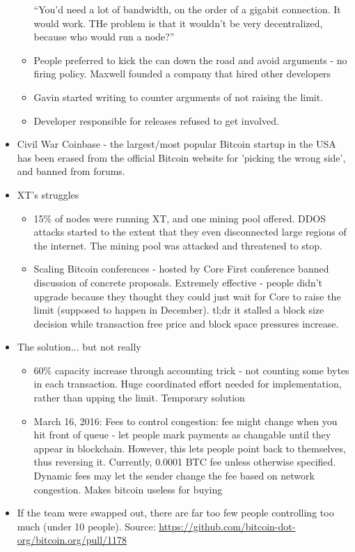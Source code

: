\documentclass{article}
\begin{document}
\begin{itemize}
\begin{itemize}
        \subitem ``You'd need a lot of bandwidth, on the order of a gigabit connection. It would work. THe problem is that it wouldn't be very decentralized, because
        who would run a node?''
      \item People preferred to kick the can down the road and avoid arguments - no firing policy. Maxwell founded a company that hired other developers
      \item Gavin started writing to counter arguments of not raising the limit.
      \item Developer responsible for releases refused to get involved.
    \end{itemize}
  \item Civil War
    \subitem Coinbase - the largest/most popular Bitcoin startup in the USA has been erased from the official Bitcoin website for
    'picking the wrong side', and banned from forums.
  \item XT's struggles
    \begin{itemize}
      \item 15\% of nodes were running XT, and one mining pool offered. DDOS attacks started to the extent that
        they even disconnected large regions of the internet. The mining pool was attacked and threatened to stop.
      \item Scaling Bitcoin conferences - hosted by Core
        \subitem First conference banned discussion of concrete proposals.
        \subitem Extremely effective - people didn't upgrade because they thought they could just wait for Core to raise the limit (supposed to
        happen in December).
        \subitem tl;dr it stalled a block size decision while transaction free price and block space pressures increase.
    \end{itemize}
  \item The solution... but not really
    \begin{itemize}
      \item 60\% capacity increase through accounting trick - not counting some bytes in each transaction.
        \subitem Huge coordinated effort needed for implementation, rather than upping the limit.
        \subitem Temporary solution
      \item March 16, 2016: Fees to control congestion: fee might change when you hit front of queue - let people mark payments as
        changable until they appear in blockchain. However, this lets people point back to themselves, thus reversing it.
        \subitem Currently, 0.0001 BTC fee unless otherwise specified. Dynamic fees may let the sender change the fee based on network congestion.
        \subitem Makes bitcoin useless for buying
    \end{itemize}
  \item If the team were swapped out, there are far too few people controlling too much (under 10 people).
    Source: \url{https://github.com/bitcoin-dot-org/bitcoin.org/pull/1178}


\end{itemize}
\end{document}

